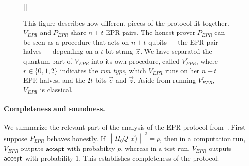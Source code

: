 \documentclass[11pt]{article}
\numberwithin{equation}{section}
\theoremstyle{definition}
\theoremstyle{plain}
\newcommand{\ket}[1]{|#1\rangle}
\newcommand{\norm}[1]{\left\|#1\right\|}
\begin{document}
\begin{figure}[t]
[\FBwidth]
{
  
}
{\caption{This figure describes how different pieces of the protocol fit together. $V_{EPR}$ and $P_{EPR}$ share $n+t$ EPR pairs. The honest prover $P_{EPR}$ can be seen as a procedure that acts on $n+t$ qubits --- the EPR pair halves --- depending on a $t$-bit string $\vec{z}$.  We have separated the quantum part of $V_{EPR}$ into its own procedure, called $V_{EPR}^{r}$, where $r\in\{0,1,2\}$ indicates the \emph{run type}, which $V_{EPR}$ runs on her $n+t$ EPR halves, and the $2t$ bits $\vec{c}$ and $\vec{z}$. Aside from running $V_{EPR}^r$, $V_{EPR}$ is classical. }\label{fig:EPR-high-level}}
\end{figure}






\paragraph{Completeness and soundness.}  %
We summarize the relevant part of the analysis of the EPR protocol from~\cite{broadbent15howtoverify}. First suppose $P_{EPR}$ behaves honestly. If $\norm{\Pi_0 Q\ket{\vec{x}}}^2=p$, then in a computation run, $V_{EPR}$ outputs $\sf accept$ with probability $p$, whereas in a test run, $V_{EPR}$ outputs $\sf accept$ with probability $1$. This establishes completeness of the protocol:
\end{document}
